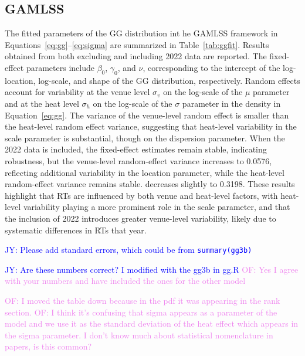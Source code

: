\documentclass[12pt, letterpaper]{article}
\newcommand{\jy}[1]{\textcolor{blue}{JY: #1}}
\newcommand{\of}[1]{\textcolor{violet}{OF: #1}}
\begin{document}
\subsection{GAMLSS} \label{subsec:Results_GLMM}

The fitted parameters of the GG distribution int he
GAMLSS framework in Equations~\eqref{eq:gg}--\eqref{eq:sigma} are
summarized in Table~\ref{tab:ggfit}. Results obtained from both
excluding and including 2022 data are reported. The fixed-effect
parameters include $\beta_0$, $\gamma_0$, and $\nu$, corresponding to
the intercept of the log-location, log-scale, and shape of the GG
distribution, respectively. Random effects account for variability at
the venue level $\sigma_v$ on the log-scale of the $\mu$ parameter
and at the heat level $\sigma_h$ on the log-scale of the $\sigma$
parameter in the density in Equation~\eqref{eq:gg}. The variance
of the venue-level random effect is smaller than the heat-level random
effect variance, suggesting that heat-level variability in the scale
parameter is substantial, though on the dispersion parameter. When the
2022 data is included, the fixed-effect estimates remain stable,
indicating robustness, but the venue-level random-effect variance
increases to 0.0576, reflecting additional variability in the location
parameter, while the heat-level random-effect variance remains stable.
decreases slightly to 0.3198. These results
highlight that RTs are influenced by both venue and heat-level
factors, with heat-level variability playing a more prominent role in the scale
parameter, and that the inclusion of 2022 introduces greater venue-level
variability, likely due to systematic differences in RTs that year.


\jy{Please add standard errors, which could be from \texttt{summary(gg3b)}}

\jy{Are these numbers correct? I modified with the gg3b in gg.R}
\of{Yes I agree with your numbers and have included the ones for the other model}

\of{I moved the table down because in the pdf it was appearing in the rank
section.} 
\of{I think it's confusing that sigma appears as a parameter of the model
and we use it as the standard deviation of the heat effect which appears in the
sigma parameter. I don't know much about statistical nomenclature in papers, is
this common?}
\end{document}
